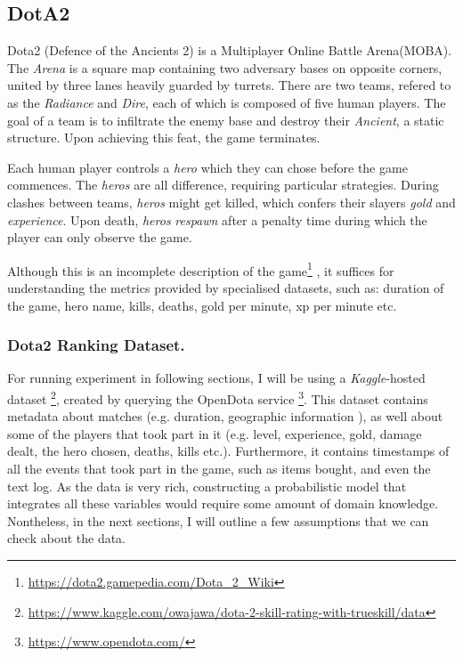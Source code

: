 \documentclass[10pt,a4]{article}
\begin{document}
\subsection{DotA2}

Dota2 (Defence of the Ancients 2) is a Multiplayer Online Battle Arena(MOBA). 
The \emph{Arena} is a square map 
containing two adversary bases on opposite corners, united by three lanes heavily
guarded by turrets. There are two teams, refered to as the \emph{Radiance} and \emph{Dire},
each of which is composed of five human players. The goal of a team is to infiltrate 
the enemy base and destroy their \emph{Ancient}, a static structure. Upon achieving
this feat, the game terminates.

Each human player controls a \emph{hero} which they can chose before the game commences.
The \emph{heros} are all difference, requiring particular strategies. During 
clashes between teams, \emph{heros} might get killed, which confers their slayers
\emph{gold} and \emph{experience}. Upon death, \emph{heros} \emph{respawn} after 
a penalty time during which the player can only observe the game. 

Although this is an incomplete description of the game\footnote{\url{https://dota2.gamepedia.com/Dota_2_Wiki}}
, it suffices for understanding the metrics provided by specialised datasets, such as: 
duration of the game, hero name, kills, deaths, gold per minute, xp per minute etc.

\subsubsection{Dota2 Ranking Dataset.}

For running experiment in following sections, I will be using a \emph{Kaggle}-hosted
dataset \footnote{\url{https://www.kaggle.com/owajawa/dota-2-skill-rating-with-trueskill/data}},
created by querying the OpenDota service \footnote{\url{https://www.opendota.com/}}.
This dataset contains metadata about matches (e.g. duration, geographic information
), as well about some of the players that took part in it (e.g. level, experience, 
gold, damage dealt, the hero chosen, deaths, kills etc.). Furthermore, it contains
timestamps of all the events that took part in the game, such as items bought, 
and even the text log. As the data is very rich, constructing a probabilistic model
that integrates all these variables would require some amount of domain knowledge. 
Nontheless, in the next sections, I will outline a few assumptions that we can
check about the data. 
\end{document}
